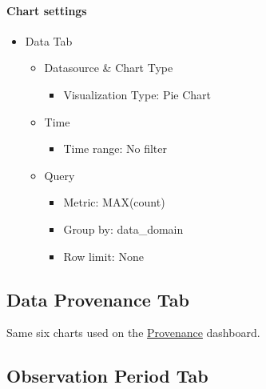 \documentclass[
]{book}
\providecommand{\tightlist}{%
  \setlength{\itemsep}{0pt}\setlength{\parskip}{0pt}}
\begin{document}
\hypertarget{chart-settings-33}{%
\paragraph*{Chart settings}\label{chart-settings-33}}

\begin{itemize}
\tightlist
\item
  Data Tab

  \begin{itemize}
  \tightlist
  \item
    Datasource \& Chart Type

    \begin{itemize}
    \tightlist
    \item
      Visualization Type: Pie Chart
    \end{itemize}
  \item
    Time

    \begin{itemize}
    \tightlist
    \item
      Time range: No filter
    \end{itemize}
  \item
    Query

    \begin{itemize}
    \tightlist
    \item
      Metric: MAX(count)
    \item
      Group by: data\_domain
    \item
      Row limit: None
    \end{itemize}
  \end{itemize}
\end{itemize}

\hypertarget{data-provenance-tab}{%
\subsection*{Data Provenance Tab}\label{data-provenance-tab}}

Same six charts used on the \protect\hyperlink{dataProvenanceCharts}{Provenance} dashboard.

\hypertarget{observation-period-tab}{%
\subsection*{Observation Period Tab}\label{observation-period-tab}}
\end{document}
